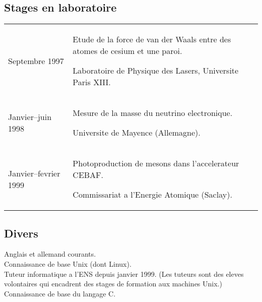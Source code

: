 \documentclass[12pt,a4paper]{article}
\begin{document}
\subsection*{Stages en laboratoire}
\noindent \begin{tabular}{@{}p{\annee}p{\texte}@{}}
Septembre 1997 & Etude de la force de van der Waals entre des atomes de
cesium et une paroi. \par
	Laboratoire de Physique des Lasers, Universite Paris XIII. \\
Janvier--juin 1998 & Mesure de la masse du neutrino electronique. \par
	Universite de Mayence (Allemagne). \\
Janvier--fevrier 1999 & Photoproduction de mesons dans l'accelerateur
CEBAF. \par
	Commissariat a l'Energie Atomique (Saclay).
\end{tabular}

\subsection*{Divers}
\noindent
Anglais et allemand courants. \\
Connaissance de base Unix (dont Linux). \\
Tuteur informatique a l'ENS depuis janvier 1999. (Les tuteurs sont des eleves
volontaires qui encadrent des stages de formation aux machines Unix.) \\
Connaissance de base du langage C.
\end{document}
